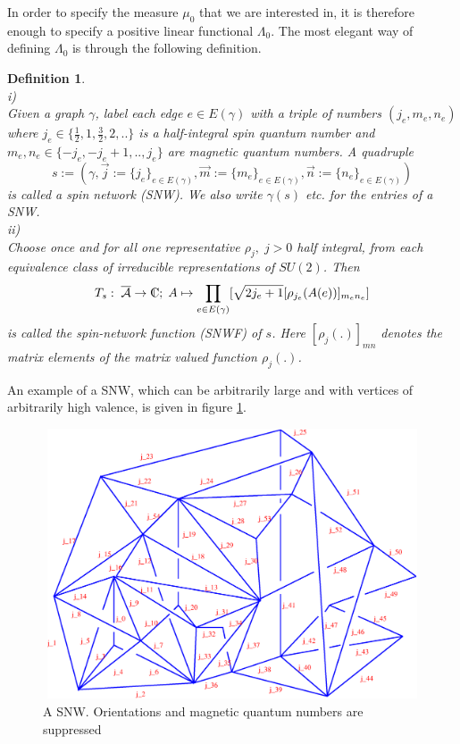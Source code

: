 \documentclass[12pt]{report}
\newtheorem{Definition}{Definition}[section]
\def\be{\begin{equation}}
\def\ee{\end{equation}}
\def\a{{\cal A}}
\def\ab{\overline{\a}}
\def\Cl{{\mathchoice
{\setbox0=\hbox{$\displaystyle\rm C$}\hbox{\hbox to0pt
{\kern0.4\wd0\vrule height0.9\ht0\hss}\box0}}
{\setbox0=\hbox{$\textstyle\rm C$}\hbox{\hbox to0pt
{\kern0.4\wd0\vrule height0.9\ht0\hss}\box0}}
{\setbox0=\hbox{$\scriptstyle\rm C$}\hbox{\hbox to0pt
{\kern0.4\wd0\vrule height0.9\ht0\hss}\box0}}
{\setbox0=\hbox{$\scriptscriptstyle\rm C$}\hbox{\hbox to0pt
{\kern0.4\wd0\vrule height0.9\ht0\hss}\box0}}}}
\begin{document}
In order to specify the measure $\mu_0$ that we are interested in, it is 
therefore enough to specify a positive linear functional $\Lambda_0$. The 
most elegant way of defining $\Lambda_0$ is through the following 
definition.
%
\begin{Definition} \label{def2.1.2.2a} ~~~~~\\
i)\\
Given a graph $\gamma$, label each edge $e\in E(\gamma)$ with a triple 
of numbers $(j_e,m_e,n_e)$ where 
$j_e\in\{\frac{1}{2},1,\frac{3}{2},2,..\}$ is a half-integral spin quantum 
number and $m_e,n_e\in\{-j_e,-j_e+1,..,j_e\}$ are magnetic quantum 
numbers. A quadruple 
\be \label{2.1.2.11}
s:=(\gamma,
\vec{j}:=\{j_e\}_{e\in E(\gamma)},
\vec{m}:=\{m_e\}_{e\in E(\gamma)},
\vec{n}:=\{n_e\}_{e\in E(\gamma)})
\ee
is called a spin network (SNW). We also write $\gamma(s)$ etc. for the 
entries of a SNW.\\
ii)\\
Choose once and for all one representative $\rho_j,\;j>0$ half integral, 
from 
each equivalence class of irreducible representations of $SU(2)$. Then 
\be \label{2.1.2.12}
T_s:\;\ab\to \Cl;\;A\mapsto
\prod_{e\in E(\gamma)} [\sqrt{2j_e+1} [\rho_{j_e}(A(e))]_{m_e n_e}]
\ee
is called the spin-network function (SNWF) of $s$. Here 
$[\rho_j(.)]_{mn}$
denotes the matrix elements of the matrix valued function $\rho_j(.)$.
\end{Definition}
%
An example of a SNW, which can be arbitrarily large and with vertices of
arbitrarily high valence, is given in figure \ref{f8a}.
%
\begin{figure} 
\includegraphics[width=16cm,height=8cm]{proc9fig8a.ps}
\caption{A SNW. Orientations and magnetic quantum numbers are suppressed}
\label{f8a}
\end{figure}
\end{document}
